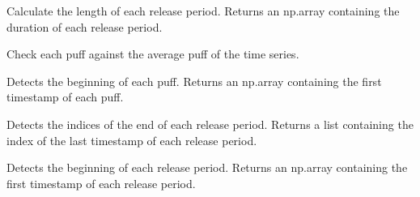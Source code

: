 \documentclass[letterpaper,10pt,english]{sphinxmanual}
\begin{document}
\begin{fulllineitems}

\begin{fulllineitems}
\label{\detokenize{index:windtunnel.PuffConcentration.calc_release_length}}
Calculate the length of each release period. Returns an np.array
containing the duration of each release period.

\end{fulllineitems}


\begin{fulllineitems}
\label{\detokenize{index:windtunnel.PuffConcentration.check_against_avg_puff}}
Check each puff against the average puff of the time series.

\end{fulllineitems}


\begin{fulllineitems}
\label{\detokenize{index:windtunnel.PuffConcentration.detect_arrival_time}}
Detects the beginning of each puff. Returns an np.array 
containing the first timestamp of each puff.

\end{fulllineitems}


\begin{fulllineitems}
\label{\detokenize{index:windtunnel.PuffConcentration.detect_begin_release_index}}
Detects the indices of the end of each release period. Returns a
list containing the index of the last timestamp of each release 
period.

\end{fulllineitems}


\begin{fulllineitems}
\label{\detokenize{index:windtunnel.PuffConcentration.detect_begin_release_period}}
Detects the beginning of each release period. Returns an np.array 
containing the first timestamp of each release period.


\end{fulllineitems}
\end{fulllineitems}
\end{document}
